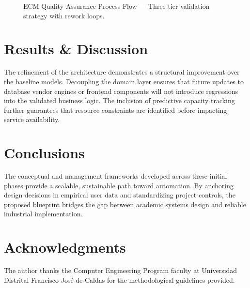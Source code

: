 \documentclass[conference]{IEEEtran}
\begin{document}
\begin{figure}[h]
{
}
\caption{ECM Quality Assurance Process Flow — Three-tier validation strategy with rework loops.}
\label{fig:qa_flow}
\end{figure}

\section{Results \& Discussion} 
The refinement of the architecture demonstrates a structural improvement over the baseline models. Decoupling the domain layer ensures that future updates to database vendor engines or frontend components will not introduce regressions into the validated business logic. The inclusion of predictive capacity tracking further guarantees that resource constraints are identified before impacting service availability.

\section{Conclusions}
The conceptual and management frameworks developed across these initial phases provide a scalable, sustainable path toward automation. By anchoring design decisions in empirical user data and standardizing project controls, the proposed blueprint bridges the gap between academic systems design and reliable industrial implementation.

\section*{Acknowledgments}
The author thanks the Computer Engineering Program faculty at Universidad Distrital Francisco Jos\'e de Caldas for the methodological guidelines provided.
\end{document}
